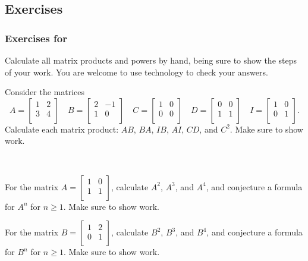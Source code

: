 \subsection{Exercises}

\subsubsection*{Exercises for 
 \submatpowers}

Calculate all matrix products and powers by hand, being sure to show the steps of your work.  You are welcome to use technology to check your answers.

\begin{exer}[\exerP] %
\label{exer_mult_matrices}
    Consider the matrices $$A= \left[ \begin{array}{cc} 1 & 2\\ 3 & 4 \\ \end{array} \right] \quad B = \left[ \begin{array}{cc} 2 & -1\\ 1 & 0 \\ \end{array} \right] \quad C= \left[ \begin{array}{cc} 1 & 0\\ 0 & 0 \\ \end{array} \right] \quad D=\left[ \begin{array}{cc} 0 & 0\\ 1 & 1 \\ \end{array} \right] \quad I=\left[ \begin{array}{cc} 1 & 0\\ 0 & 1 \\ \end{array} \right].$$  Calculate each matrix product: $AB$, $BA$, $IB$, $AI$, $CD$, and $C^2$. Make sure to show work.
\end{exer}

\begin{exer}[\exerP] %
\label{exer_power_linears}
~
    \begin{exerpart}
       \item For the matrix $A=\left[ \begin{array}{cc} 1 & 0 \\ 1 & 1 \\ \end{array} \right]$, calculate $A^2$, $A^3$, and $A^4$, and conjecture a formula for $A^n$ for $n \ge 1$. Make sure to show work. %
       \item For the matrix $B=\left[ \begin{array}{cc} 1 & 2 \\ 0 & 1 \\ \end{array} \right]$, calculate $B^2$, $B^3$, and $B^4$, and conjecture a formula for $B^n$ for $n \ge 1$. Make sure to show work.
   \end{exerpart}
\end{exer}

